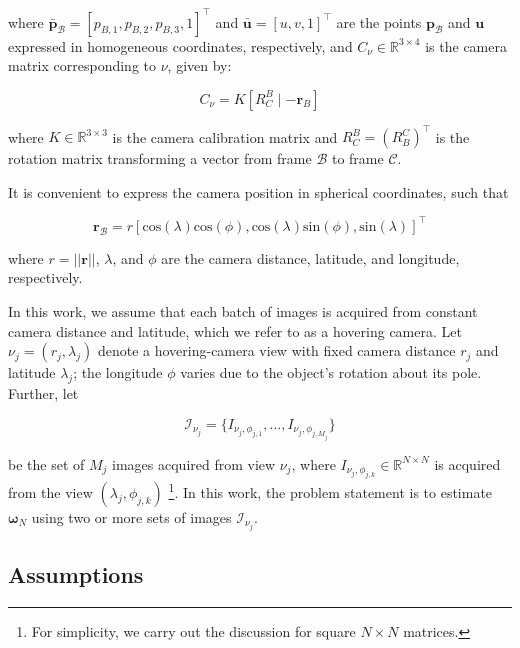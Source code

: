 where $\bar{\mathbf{p}}_\mathcal{B}=[p_{B,1},p_{B,2},p_{B,3},1]^\top$ and $\bar{\mathbf{u}}=[u,v,1]^\top$ are the points $\mathbf{p}_\mathcal{B}$ and $\mathbf{u}$ expressed in homogeneous coordinates, respectively, and $C_\nu\in \mathbb{R}^{3\times 4}$ is the camera matrix corresponding to $\nu$, given by:

\begin{equation}
\label{eq:C_nu}
    C_\nu = K \left[ R^B_C \mid -\mathbf{r}_B \right]
\end{equation}

where $K\in \mathbb{R}^{3\times 3}$ is the camera calibration matrix and $R^B_C = \left( R^C_B \right)^\top$ is the rotation matrix transforming a vector from frame $\mathcal{B}$ to frame $\mathcal{C}$\cite{henry2023absolute}.

It is convenient to express the camera position in spherical coordinates, such that

\begin{equation}
    \mathbf{r}_\mathcal{B} = r [\mathrm{cos}(\lambda)\mathrm{cos}(\phi),\mathrm{cos}(\lambda)\mathrm{sin}(\phi),\mathrm{sin}(\lambda)]^\top
\end{equation}

where $r = ||\mathbf{r}||$, $\lambda$, and $\phi$ are the camera distance, latitude, and longitude, respectively.

In this work, we assume that each batch of images is acquired from constant camera distance and latitude, which we refer to as a hovering camera. Let $\nu_j=(r_j,\lambda_j)$ denote a hovering-camera view with fixed camera distance $r_j$ and latitude $\lambda_j$; the longitude $\phi$ varies due to the object's rotation about its pole. Further, let 

\begin{equation}
\label{eq:I_nu_j}
    \mathcal{I}_{\nu_j}=\{I_{\nu_j,\phi_{j,1}} , \dots, I_{\nu_j,\phi_{j,M_j}} \}
\end{equation}

be the set of $M_j$ images acquired from view $\nu_j$, where  $I_{\nu_j,\phi_{j,k}} \in \mathbb{R}^{N\times N}$ is acquired from the view $(\lambda_j, \phi_{j,k})$ \footnote{For simplicity, we carry out the discussion for square $N\times N$ matrices.}. In this work, the problem statement is to estimate $\boldsymbol{\omega}_N$ using two or more sets of images $\mathcal{I}_{\nu_j}$.

\subsection{Assumptions}
\label{sec:assumptions}

